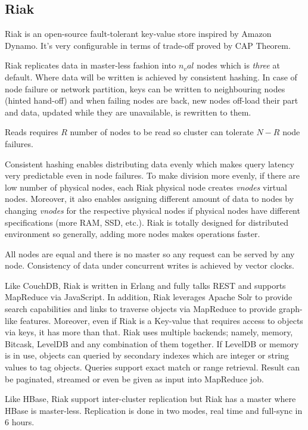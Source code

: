 \subsection{Riak}

Riak is an open-source fault-tolerant key-value store inspired by Amazon Dynamo. It's very configurable in terms of trade-off proved by CAP Theorem.

Riak replicates data in master-less fashion into $n_val$ nodes which is \textit{three} at default. Where data will be written is achieved by consistent hashing. In case of node failure or network partition, keys can be written to neighbouring nodes (hinted hand-off) and when failing nodes are back, new nodes off-load their part and data, updated while they are unavailable, is rewritten to them.

Reads requires $R$ number of nodes to be read so cluster can tolerate $N - R$ node failures.

Consistent hashing enables distributing data evenly which makes query latency very predictable even in node failures. To make division more evenly, if there are low number of physical nodes, each Riak physical node creates \textit{vnodes} virtual nodes. Moreover, it also enables assigning different amount of data to nodes by changing \textit{vnodes} for the respective physical nodes if physical nodes have different specifications (more RAM, SSD, etc.). Riak is totally designed for distributed environment so generally, adding more nodes makes operations faster.

All nodes are equal and there is no master so any request can be served by any node. Consistency of data under concurrent writes is achieved by vector clocks.

Like CouchDB, Riak is written in Erlang and fully talks REST and supports MapReduce via JavaScript. In addition, Riak leverages Apache Solr to provide search capabilities and links to traverse objects via MapReduce to provide graph-like features. Moreover, even if Riak is a Key-value that requires access to objects via keys, it has more than that. Riak uses multiple backends; namely, memory, Bitcask, LevelDB and any combination of them together. If LevelDB or memory is in use, objects can queried by secondary indexes which are integer or string values to tag objects. Queries support exact match or range retrieval. Result can be paginated, streamed or even be given as input into MapReduce job.

Like HBase, Riak support inter-cluster replication but Riak has a master where HBase is master-less. Replication is done in two modes, real time and full-sync in 6 hours.


